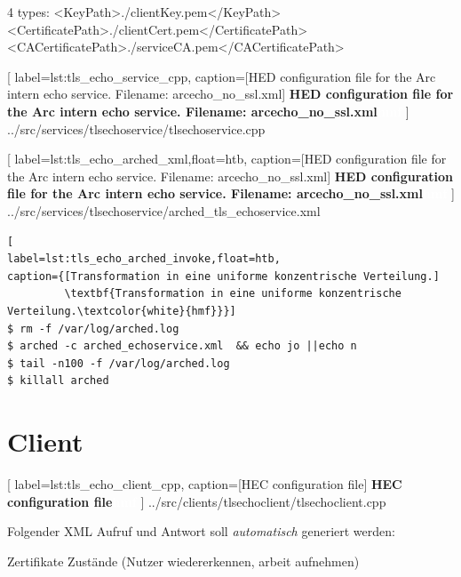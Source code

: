 4 types:
                <KeyPath>./clientKey.pem</KeyPath>
                <CertificatePath>./clientCert.pem</CertificatePath>
                <CACertificatePath>./serviceCA.pem</CACertificatePath>


	[
	label=lst:tls_echo_service_cpp,
	caption={[HED configuration file for the Arc intern echo service. Filename: arcecho\_no\_ssl.xml]
	\textbf{HED configuration file for the Arc intern echo service. Filename: arcecho\_no\_ssl.xml\textcolor{white}{hmf}}}
	]
{../src/services/tlsechoservice/tlsechoservice.cpp}





	[
	label=lst:tls_echo_arched_xml,float=htb,
	caption={[HED configuration file for the Arc intern echo service. Filename: arcecho\_no\_ssl.xml]
	\textbf{HED configuration file for the Arc intern echo service. Filename: arcecho\_no\_ssl.xml\textcolor{white}{hmf}}}
	]
{../src/services/tlsechoservice/arched_tls_echoservice.xml}


\begin{lstlisting}[
label=lst:tls_echo_arched_invoke,float=htb,
caption={[Transformation in eine uniforme konzentrische Verteilung.]
         \textbf{Transformation in eine uniforme konzentrische Verteilung.\textcolor{white}{hmf}}}]
$ rm -f /var/log/arched.log
$ arched -c arched_echoservice.xml  && echo jo ||echo n
$ tail -n100 -f /var/log/arched.log
$ killall arched
\end{lstlisting}




\clearpage
\section{Client}


	[
	label=lst:tls_echo_client_cpp,
	caption={[HEC configuration file]
	\textbf{HEC configuration file\textcolor{white}{hmf}}}
	]
{../src/clients/tlsechoclient/tlsechoclient.cpp}



Folgender XML Aufruf und Antwort soll \textit{automatisch} generiert werden:






Zertifikate
Zustände (Nutzer wiedererkennen, arbeit aufnehmen)




